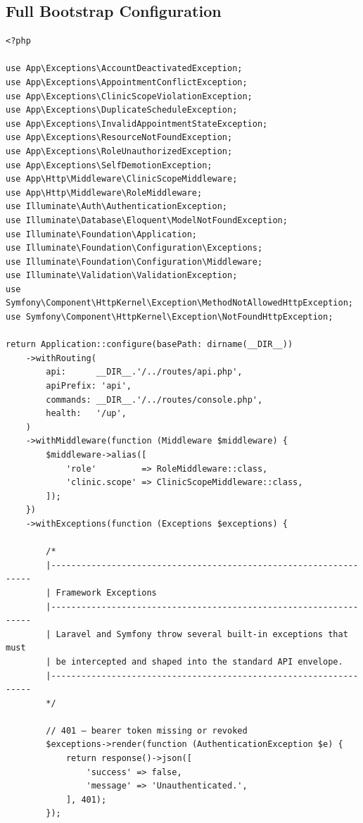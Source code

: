 \subsection{Full Bootstrap Configuration}

\begin{lstlisting}[style=php, caption={\texttt{bootstrap/app.php} ---
  Complete exception handler registration for all custom exception
  types and Laravel framework exceptions.}]
<?php

use App\Exceptions\AccountDeactivatedException;
use App\Exceptions\AppointmentConflictException;
use App\Exceptions\ClinicScopeViolationException;
use App\Exceptions\DuplicateScheduleException;
use App\Exceptions\InvalidAppointmentStateException;
use App\Exceptions\ResourceNotFoundException;
use App\Exceptions\RoleUnauthorizedException;
use App\Exceptions\SelfDemotionException;
use App\Http\Middleware\ClinicScopeMiddleware;
use App\Http\Middleware\RoleMiddleware;
use Illuminate\Auth\AuthenticationException;
use Illuminate\Database\Eloquent\ModelNotFoundException;
use Illuminate\Foundation\Application;
use Illuminate\Foundation\Configuration\Exceptions;
use Illuminate\Foundation\Configuration\Middleware;
use Illuminate\Validation\ValidationException;
use Symfony\Component\HttpKernel\Exception\MethodNotAllowedHttpException;
use Symfony\Component\HttpKernel\Exception\NotFoundHttpException;

return Application::configure(basePath: dirname(__DIR__))
    ->withRouting(
        api:      __DIR__.'/../routes/api.php',
        apiPrefix: 'api',
        commands: __DIR__.'/../routes/console.php',
        health:   '/up',
    )
    ->withMiddleware(function (Middleware $middleware) {
        $middleware->alias([
            'role'         => RoleMiddleware::class,
            'clinic.scope' => ClinicScopeMiddleware::class,
        ]);
    })
    ->withExceptions(function (Exceptions $exceptions) {

        /*
        |------------------------------------------------------------------
        | Framework Exceptions
        |------------------------------------------------------------------
        | Laravel and Symfony throw several built-in exceptions that must
        | be intercepted and shaped into the standard API envelope.
        |------------------------------------------------------------------
        */

        // 401 — bearer token missing or revoked
        $exceptions->render(function (AuthenticationException $e) {
            return response()->json([
                'success' => false,
                'message' => 'Unauthenticated.',
            ], 401);
        });


\end{lstlisting}
